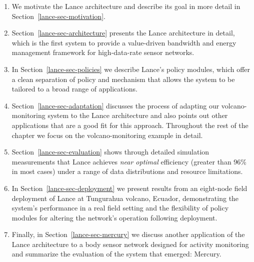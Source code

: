 \begin{enumerate}

\item We motivate the Lance architecture and describe its goal in more detail
in Section~\ref{lance-sec-motivation}.

\item Section~\ref{lance-sec-architecture} presents the Lance architecture in
detail, which is the first system to provide a value-driven bandwidth and
energy management framework for high-data-rate sensor networks.

\item In Section~\ref{lance-sec-policies} we describe Lance's policy modules,
which offer a clean separation of policy and mechanism that allows the system
to be tailored to a broad range of applications.

\item Section~\ref{lance-sec-adaptation} discusses the process of adapting
our volcano-monitoring system to the Lance architecture and also points out
other applications that are a good fit for this approach.  Throughout the
rest of the chapter we focus on the volcano-monitoring example in detail.

\item Section~\ref{lance-sec-evaluation} shows through detailed simulation
measurements that Lance achieves \textit{near optimal} efficiency (greater
than 96\% in most cases) under a range of data distributions and resource
limitations.

\item In Section~\ref{lance-sec-deployment} we present results from an
eight-node field deployment of Lance at Tungurahua volcano, Ecuador,
demonstrating the system's performance in a real field setting and the
flexibility of policy modules for altering the network's operation following
deployment.

\item Finally, in Section~\ref{lance-sec-mercury} we discuss another
application of the Lance architecture to a body sensor network designed for
activity monitoring and summarize the evaluation of the system that emerged:
Mercury.

\end{enumerate}

